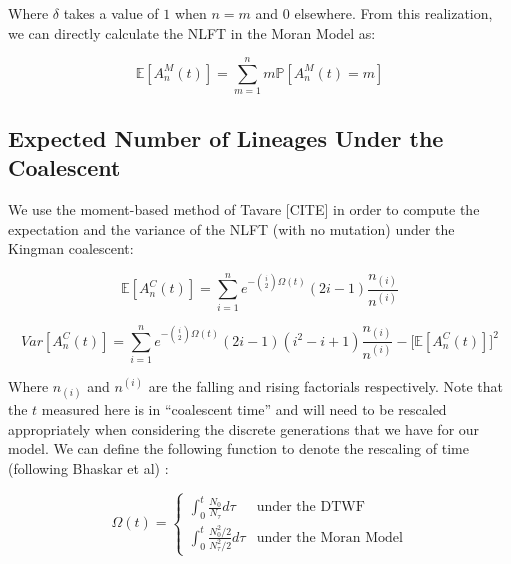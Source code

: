 \documentclass[11pt]{article}
\begin{document}
 Where $\delta$ takes a value of $1$ when $n=m$ and $0$ elsewhere. From this realization, we can directly calculate the NLFT in the Moran Model as:

 \begin{equation*}
	 \mathbb{E}[A^M_n(t)] = \sum^n_{m=1} m \mathbb{P}[A^M_n (t) = m]
 \end{equation*}

\subsection*{Expected Number of Lineages Under the Coalescent}

We use the moment-based method of Tavare [CITE] in order to compute the expectation and the variance of the NLFT (with no mutation) under the Kingman coalescent:

\begin{equation*}
	\mathbb{E}[A^C_n(t)] = \sum^n_{i=1} e^{-\binom{i}{2}\Omega(t)} (2i - 1) \frac{n_{(i)}}{n^{(i)}} 
\end{equation*}

\begin{equation*}
	Var[A^C_n(t)] = \sum^n_{i=1} e^{-\binom{i}{2}\Omega(t)}(2i-1)(i^2 - i + 1)\frac{n_{(i)}}{n^{(i)}} - \Bigg[\mathbb{E}[A^C_n(t)]\Bigg]^2
\end{equation*}

Where $n_{(i)}$ and $n^{(i)}$ are the falling and rising factorials respectively. Note that the $t$ measured here is in ``coalescent time'' and will need to be rescaled appropriately when considering the discrete generations that we have for our model. We can define the following function to denote the rescaling of time (following Bhaskar et al) :

\begin{equation*}
	\Omega(t) = \begin{cases}
		\int_{0}^t \frac{N_0}{N_\tau} d\tau &\text{under the DTWF}\\[2ex]
		\int_{0}^t \frac{N_0^2/2}{N_\tau^2/2} d\tau  &\text{under the Moran Model}
	\end{cases}
\end{equation*}


\end{document}
